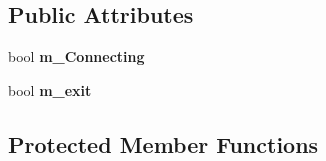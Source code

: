 \subsection*{Public Attributes}
\begin{DoxyCompactItemize}
\item 
\mbox{\label{class_fox_client_a926cdf97f7f53ce36f3164b70867bb73}} 
bool {\bfseries m\+\_\+\+Connecting}
\item 
\mbox{\label{class_fox_client_af93081d64588450a497db581ed89806a}} 
bool {\bfseries m\+\_\+exit}
\end{DoxyCompactItemize}
\subsection*{Protected Member Functions}
